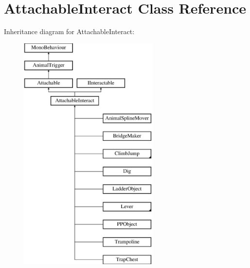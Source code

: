 \hypertarget{class_attachable_interact}{}\section{Attachable\+Interact Class Reference}
\label{class_attachable_interact}
Inheritance diagram for Attachable\+Interact\+:\begin{figure}[H]
\begin{center}
\leavevmode
\includegraphics[height=12.000000cm]{class_attachable_interact}
\end{center}
\end{figure}
